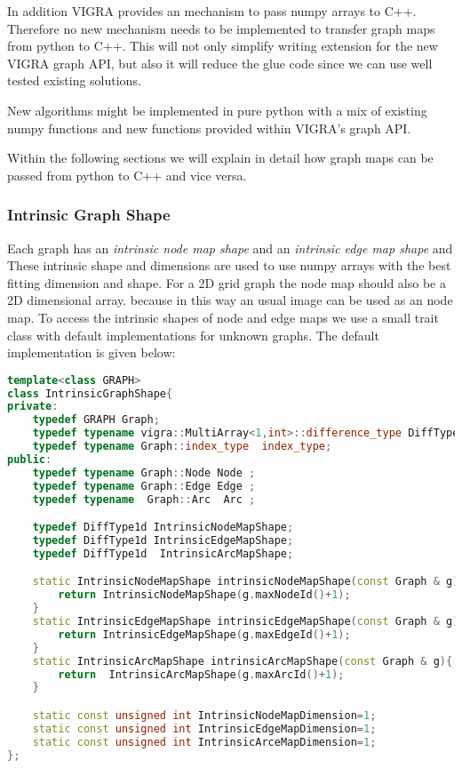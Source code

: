 In addition VIGRA provides an mechanism to pass numpy arrays to C++.
Therefore no new mechanism needs to be implemented to transfer graph
maps from python to C++.
This will not only simplify writing extension for the new VIGRA graph API,
but also it will reduce the glue code since we can use well tested existing
solutions.

New algorithms might be implemented in pure python with a mix of
existing numpy functions and new functions provided within VIGRA's graph API.


Within the following sections we will explain in detail
how graph maps can be passed from python to C++ and vice versa.



\subsubsection{Intrinsic Graph Shape}


Each graph has an \emph{intrinsic node map shape} 
and an \emph{intrinsic edge map shape} and 
These intrinsic shape and dimensions are used to use 
numpy arrays with the best fitting dimension and shape.
For a 2D grid graph the node map should also be a 2D dimensional array.
because in this way an usual image can be used as an node map.
To access the  intrinsic shapes of node and edge maps 
we use a small trait class with default implementations
for unknown graphs.
The default implementation is given below:

\begin{lstlisting}[language=c++]
template<class GRAPH>
class IntrinsicGraphShape{
private:
    typedef GRAPH Graph;
    typedef typename vigra::MultiArray<1,int>::difference_type DiffType1d;
    typedef typename Graph::index_type  index_type;
public:
    typedef typename Graph::Node Node ;
    typedef typename Graph::Edge Edge ;
    typedef typename  Graph::Arc  Arc ;

    typedef DiffType1d IntrinsicNodeMapShape;
    typedef DiffType1d IntrinsicEdgeMapShape;
    typedef DiffType1d  IntrinsicArcMapShape;

    static IntrinsicNodeMapShape intrinsicNodeMapShape(const Graph & g){
        return IntrinsicNodeMapShape(g.maxNodeId()+1);
    }
    static IntrinsicEdgeMapShape intrinsicEdgeMapShape(const Graph & g){
        return IntrinsicEdgeMapShape(g.maxEdgeId()+1);
    }
    static IntrinsicArcMapShape intrinsicArcMapShape(const Graph & g){
        return  IntrinsicArcMapShape(g.maxArcId()+1);
    }

    static const unsigned int IntrinsicNodeMapDimension=1;
    static const unsigned int IntrinsicEdgeMapDimension=1;
    static const unsigned int IntrinsicArceMapDimension=1;
};
\end{lstlisting}



